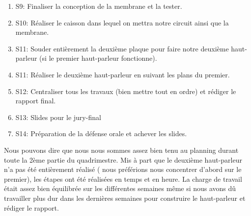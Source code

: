 \begin{enumerate}
	\item{S9}: Finaliser la conception de la membrane et la tester.
	\item{S10}: Réaliser le caisson dans lequel on mettra notre circuit ainsi que la membrane.
	\item{S11}: Souder entièrement la deuxième plaque pour faire notre deuxième haut-parleur (si le premier haut-parleur fonctionne).
	\item{S11}: Réaliser le deuxième haut-parleur en suivant les plans du premier.
	\item{S12}: Centraliser tous les travaux (bien mettre tout en ordre) et rédiger le rapport final.
	\item{S13}: Slides pour le jury-final
	\item{S14}: Préparation de la défense orale et achever les slides.
\end{enumerate}

Nous pouvons dire que nous nous sommes assez bien tenu au planning durant toute la 2ème partie du quadrimestre. 
Mis à part que le deuxième haut-parleur n'a pas été entièrement réalisé ( nous préférions nous concentrer d'abord sur 
le premier), les étapes ont été réalisées en temps et en heure.  La charge de travail était assez bien équilibrée sur 
les différentes semaines même si nous avons dû travailler plus dur dans les dernières semaines pour construire le haut-parleur
et rédiger le rapport.

